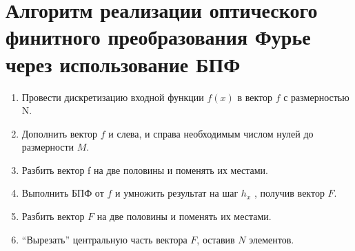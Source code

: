 \section*{Алгоритм реализации оптического финитного преобразования Фурье через использование БПФ}
{
	\begin{enumerate}
		\item Провести дискретизацию входной функции $f(x)$ в вектор $f$ с размерностью N.
		\item Дополнить вектор $f$ и слева, и справа необходимым числом нулей до размерности $M$.
		\item Разбить вектор f на две половины и поменять их местами.
		\item Выполнить БПФ от $f$ и умножить результат на шаг $h_x$ , получив вектор $F$.
		\item Разбить вектор $F$ на две половины и поменять их местами.
		\item \enquote{Вырезать} центральную часть вектора $F$, оставив $N$ элементов.
	\end{enumerate}
}
\newpage

\newpage
\tableofcontents
\newpage




\titleformat{\section}{\large\bfseries}{\thesection}{0.5em}{}
\titlespacing*{\section}{\parindent}{1ex}{1em}

